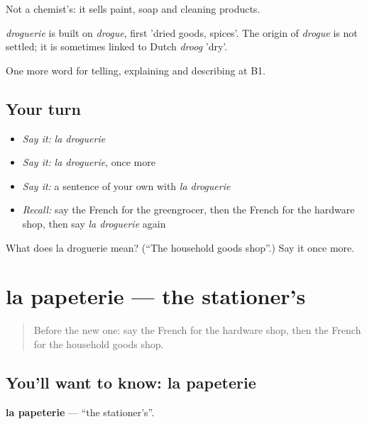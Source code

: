 Not a chemist's: it sells paint, soap and cleaning products.

\begin{cousinweb}
\emph{droguerie} is built on \emph{drogue}, first 'dried goods, spices'. The origin of \emph{drogue} is not settled; it is sometimes linked to Dutch \emph{droog} 'dry'.
\end{cousinweb}

\begin{grammarlens}[title={What you've built}]
One more word for telling, explaining and describing at B1.
\end{grammarlens}

\subsection*{Your turn}
\begin{itemize}
\raggedright
  \item \emph{Say it:} \emph{la droguerie}
  \item \emph{Say it:} \emph{la droguerie}, once more
  \item \emph{Say it:} a sentence of your own with \emph{la droguerie}
  \item \emph{Recall:} say the French for the greengrocer, then the French for the hardware shop, then say \emph{la droguerie} again
\end{itemize}

\begin{tcolorbox}[breakable,colback=teal!4,colframe=teal!35!black,title={Before you move on}]
What does la droguerie mean? (\textquotedblleft{}The household goods shop\textquotedblright{}.) Say it once more.
\end{tcolorbox}
\section[la papeterie]{la papeterie — the stationer’s}

\label{lesson:FR-C445-papeterie}



\begin{quote}
Before the new one: say the French for the hardware shop, then the French for the household goods shop.
\end{quote}

\subsection*{You'll want to know: la papeterie}
\textbf{la papeterie} — \textquotedblleft{}the stationer’s\textquotedblright{}.

